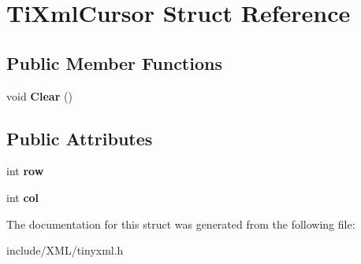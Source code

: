 \hypertarget{struct_ti_xml_cursor}{
\section{TiXmlCursor Struct Reference}
\label{struct_ti_xml_cursor}
}
\subsection*{Public Member Functions}
\begin{DoxyCompactItemize}
\item 
\hypertarget{struct_ti_xml_cursor_a1e6fa622b59dafb71b6efe595105dcdd}{
void {\bfseries Clear} ()}
\label{struct_ti_xml_cursor_a1e6fa622b59dafb71b6efe595105dcdd}

\end{DoxyCompactItemize}
\subsection*{Public Attributes}
\begin{DoxyCompactItemize}
\item 
\hypertarget{struct_ti_xml_cursor_a5b54dd949820c2db061e2be41f3effb3}{
int {\bfseries row}}
\label{struct_ti_xml_cursor_a5b54dd949820c2db061e2be41f3effb3}

\item 
\hypertarget{struct_ti_xml_cursor_a5694d7ed2c4d20109d350c14c417969d}{
int {\bfseries col}}
\label{struct_ti_xml_cursor_a5694d7ed2c4d20109d350c14c417969d}

\end{DoxyCompactItemize}


The documentation for this struct was generated from the following file:\begin{DoxyCompactItemize}
\item 
include/XML/tinyxml.h\end{DoxyCompactItemize}
